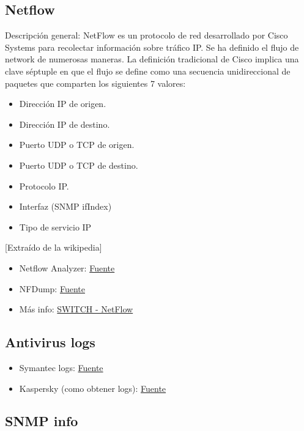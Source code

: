 \documentclass[a4paper,12pt]{article}
\begin{document}
\subsection{Netflow}

Descripción general: NetFlow es un protocolo de red desarrollado por Cisco Systems para recolectar información sobre tráfico IP. Se ha definido el flujo de network de numerosas maneras. La definición tradicional de Cisco implica una clave séptuple en que el flujo se define como una secuencia unidireccional de paquetes que comparten los siguientes 7 valores:

\begin{itemize}
\item Dirección IP de origen.
\item Dirección IP de destino.
\item Puerto UDP o TCP de origen.
\item Puerto UDP o TCP de destino.
\item Protocolo IP.
\item Interfaz (SNMP ifIndex)
\item Tipo de servicio IP
\end{itemize}
    [Extraído de la wikipedia]
    
\begin{itemize}
\item Netflow Analyzer: \href{https://www.manageengine.com/es/netflow/}{Fuente}
\item NFDump: \href{http://nfdump.sourceforge.net/}{Fuente}
\item Más info: \href{http://www.switch.ch/network/projects/completed/TF-NGN/floma/software.html}{SWITCH - NetFlow}
\end{itemize}

\subsection{Antivirus logs}

\begin{itemize}
\item Symantec logs: \href{https://support.symantec.com/en_US/article.TECH100099.html}{Fuente}
\item Kaspersky (como obtener logs): \href{http://support.kaspersky.com/8869}{Fuente}
\end{itemize}

\subsection{SNMP info}
\end{document}
